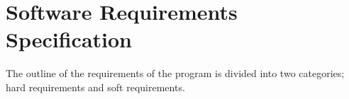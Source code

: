 \section{Software Requirements Specification}

The outline of the requirements of the program is divided into two categories; hard requirements and soft requirements.
